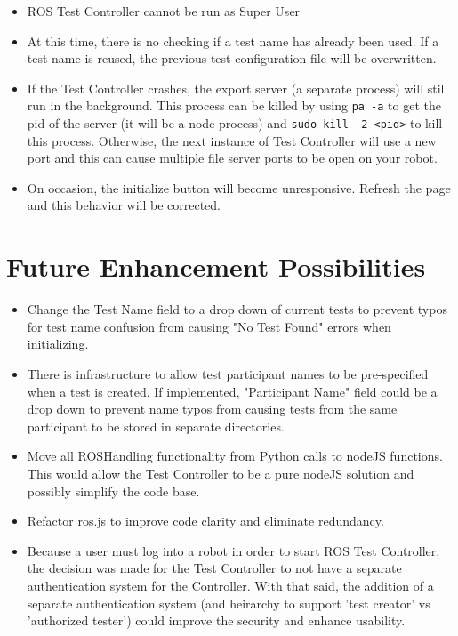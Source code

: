 \documentclass[onecolumn, draftclsnofoot,10pt, compsoc]{report}
\begin{document}
\begin{itemize}
	\item ROS Test Controller cannot be run as Super User

	\item At this time, there is no checking if a test name has already been used. If a test name is reused, the previous test configuration file will be overwritten.

	\item If the Test Controller crashes, the export server (a separate process) will still run in the background. This process can be killed by using \texttt{pa -a} to get the pid of the server (it will be a node process) and \texttt{sudo kill -2 <pid>} to kill this process. Otherwise, the next instance of Test Controller will use a new port and this can cause multiple file server ports to be open on your robot.

	\item On occasion, the initialize button will become unresponsive. Refresh the page and this behavior will be corrected.
\end{itemize}

\section{Future Enhancement Possibilities}

\begin{itemize}
	\item Change the Test Name field to a drop down of current tests to prevent typos for test name confusion from causing "No Test Found" errors when initializing.

	\item There is infrastructure to allow test participant names to be pre-specified when a test is created. If implemented, "Participant Name" field could be a drop down to prevent name typos from causing tests from the same participant to be stored in separate directories.

	\item Move all ROSHandling functionality from Python calls to nodeJS functions. This would allow the Test Controller to be a pure nodeJS solution and possibly simplify the code base.

	\item Refactor ros.js to improve code clarity and eliminate redundancy.

	\item Because a user must log into a robot in order to start ROS Test Controller, the decision was made for the Test Controller to not have a separate authentication system for the Controller. With that said, the addition of a separate authentication system (and heirarchy to support 'test creator' vs 'authorized tester') could improve the security and enhance usability.
\end{itemize}
\end{document}
